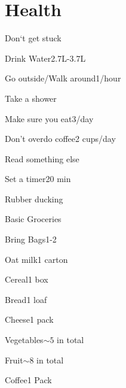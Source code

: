 
\section{Health}

\begin{checklist}{Don`t get stuck}
  \item{Drink Water}{2.7L-3.7L\cite{appel2005dietary}} 
  \item{Go outside/Walk around}{1/hour}
  \item{Take a shower}{}
  \item{Make sure you eat}{3/day}
  \item{Don't overdo coffee}{2 cups/day}
  \item{Read something else}{\cite{compiling}}
  \item{Set a timer}{20 min}
  \item{Rubber ducking}{}
\end{checklist}

\begin{checklist}{Basic Groceries}
    \item{Bring Bags}{1-2}
    \item{Oat milk}{1 carton} 
    \item{Cereal}{1 box}
    \item{Bread}{1 loaf}
    \item{Cheese}{1 pack}
    \item{Vegetables}{$\sim 5$ in total}
    \item{Fruit}{$\sim 8$ in total}
    \item{Coffee}{1 Pack}
\end{checklist}